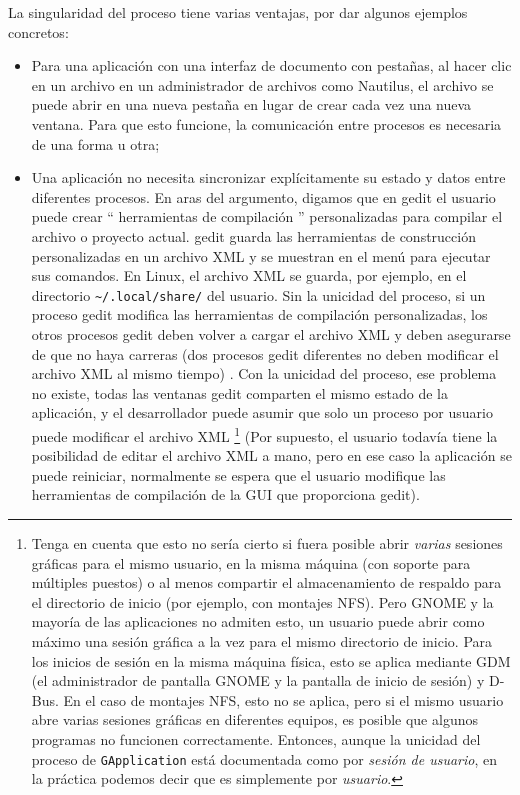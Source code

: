 La singularidad del proceso tiene varias ventajas, por dar algunos ejemplos concretos:
\begin{itemize}
  \item Para una aplicación con una interfaz de documento con pestañas, al hacer clic en un archivo en un administrador de archivos como Nautilus, el archivo se puede abrir en una nueva pestaña en lugar de crear cada vez una nueva ventana. Para que esto funcione, la comunicación entre procesos es necesaria de una forma u otra;
  \item Una aplicación no necesita sincronizar explícitamente su estado y datos entre diferentes procesos. En aras del argumento, digamos que en gedit el usuario puede crear `` herramientas de compilación '' personalizadas para compilar el archivo o proyecto actual. gedit guarda las herramientas de construcción personalizadas en un archivo XML y se muestran en el menú para ejecutar sus comandos. En Linux, el archivo XML se guarda, por ejemplo, en el directorio \texttt{\textasciitilde{}/.local/share/} del usuario. Sin la unicidad del proceso, si un proceso gedit modifica las herramientas de compilación personalizadas, los otros procesos gedit deben volver a cargar el archivo XML y deben asegurarse de que no haya carreras (dos procesos gedit diferentes no deben modificar el archivo XML al mismo tiempo) . Con la unicidad del proceso, ese problema no existe, todas las ventanas gedit comparten el mismo estado de la aplicación, y el desarrollador puede asumir que solo un proceso por usuario puede modificar el archivo XML \footnote{Tenga en cuenta que esto no sería cierto si fuera posible abrir \emph{varias} sesiones gráficas para el mismo usuario, en la misma máquina (con soporte para múltiples puestos) o al menos compartir el almacenamiento de respaldo para el directorio de inicio (por ejemplo, con montajes NFS). Pero GNOME y la mayoría de las aplicaciones no admiten esto, un usuario puede abrir como máximo una sesión gráfica a la vez para el mismo directorio de inicio. Para los inicios de sesión en la misma máquina física, esto se aplica mediante GDM (el administrador de pantalla GNOME y la pantalla de inicio de sesión) y D-Bus. En el caso de montajes NFS, esto no se aplica, pero si el mismo usuario abre varias sesiones gráficas en diferentes equipos, es posible que algunos programas no funcionen correctamente. Entonces, aunque la unicidad del proceso de \lstinline{GApplication} está documentada como por \emph{sesión de usuario}, en la práctica podemos decir que es simplemente por \emph{usuario}.} (Por supuesto, el usuario todavía tiene la posibilidad de editar el archivo XML a mano, pero en ese caso la aplicación se puede reiniciar, normalmente se espera que el usuario modifique las herramientas de compilación de la GUI que proporciona gedit).
\end{itemize}

